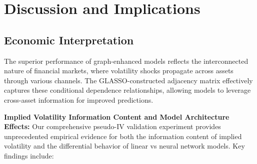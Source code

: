 \documentclass[12pt,a4paper]{article}
\begin{document}
\section{Discussion and Implications}

\subsection{Economic Interpretation}

The superior performance of graph-enhanced models reflects the interconnected nature of financial markets, where volatility shocks propagate across assets through various channels. The GLASSO-constructed adjacency matrix effectively captures these conditional dependence relationships, allowing models to leverage cross-asset information for improved predictions.

\textbf{Implied Volatility Information Content and Model Architecture Effects:} Our comprehensive pseudo-IV validation experiment provides unprecedented empirical evidence for both the information content of implied volatility and the differential behavior of linear vs neural network models. Key findings include:
\end{document}
